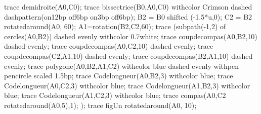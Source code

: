 \begin{changemargin}{0mm}{-15mm}
\begin{methode}
\begin{Geometrie}[CoinHD={(8.5u,5u)}]
                trace demidroite(A0,C0);
                trace bissectrice(B0,A0,C0) withcolor Crimson dashed dashpattern(on12bp off6bp on3bp off6bp);
                B2 = B0 shifted (-1.5*u,0);
                C2 = B2 rotatedaround(A0, 60);
                A1=rotation(B2,C2,60);
                trace (subpath(-1,2) of cercles(A0,B2)) dashed evenly withcolor 0.7white;
                trace coupdecompas(A0,B2,10) dashed evenly;
                trace coupdecompas(A0,C2,10) dashed evenly;
                trace coupdecompas(C2,A1,10) dashed evenly;
                trace coupdecompas(B2,A1,10) dashed evenly;
                trace polygone(A0,B2,A1,C2) withcolor blue dashed evenly withpen pencircle scaled 1.5bp;
                trace Codelongueur(A0,B2,3) withcolor blue;
                trace Codelongueur(A0,C2,3) withcolor blue;
                trace Codelongueur(A1,B2,3) withcolor blue;
                trace Codelongueur(A1,C2,3) withcolor blue;                
                trace compas(A0,C2 rotatedaround(A0,5),1);
            );
            trace figUn rotatedaround(A0, 10);
        \end{Geometrie}
    \end{methode}
\end{changemargin}
